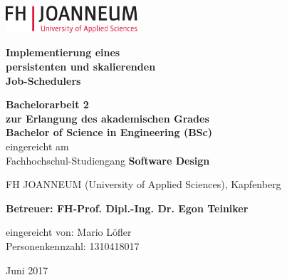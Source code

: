 \chapterend
{}
\begin{titlepage}

\begin{center}
\includegraphics[height=1cm]{images/logo_FHJ_100mm_cmyk}
\hfill

\mbox{}\vfill

  \large

  {\huge\bf Implementierung eines \\persistenten und skalierenden\\Job-Schedulers}

  \vspace{2.0cm}

  {\bf Bachelorarbeit 2}\\
{\bf zur Erlangung des akademischen Grades\\ Bachelor of Science in Engineering (BSc)}\\
eingereicht am\\
Fachhochschul-Studiengang {\bf Software Design} 


  \vspace{0.5cm}

 FH JOANNEUM  (University of Applied Sciences), Kapfenberg

  \vspace{1.5cm}

  \mbox{}

  {\bf Betreuer: FH-Prof. Dipl.-Ing. Dr. Egon Teiniker

  eingereicht von: Mario Löfler\\
  Personenkennzahl: 1310418017}

  \vspace{1.5cm}

   Juni 2017

\end{center}
\vfill\mbox{}


\end{titlepage}




\chapterend






\chapterend
